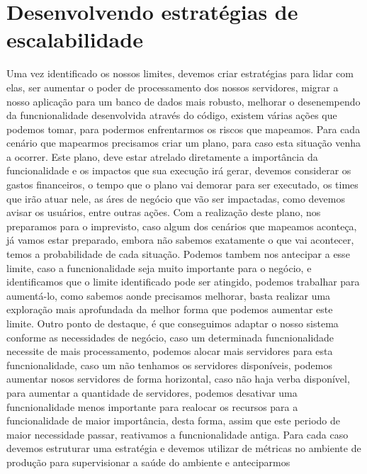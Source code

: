     \section{Desenvolvendo estratégias de escalabilidade}
      Uma vez identificado os nossos limites, devemos criar estratégias para lidar
      com elas, ser aumentar o poder de processamento dos nossos servidores,
      migrar a nosso aplicação para um banco de dados mais robusto, melhorar o
      desenempendo da funcnionalidade desenvolvida através do código, existem
      várias ações que podemos tomar, para podermos enfrentarmos os riscos que
      mapeamos. \newline
      Para cada cenário que mapearmos precisamos criar um plano, para caso esta
      situação venha a ocorrer. Este plano, deve estar atrelado diretamente a
      importância da funcionalidade e os impactos que sua execução irá gerar,
      devemos considerar os gastos financeiros, o tempo que o plano vai demorar
      para ser executado, os times que irão atuar nele, as áres de negócio que vão
      ser impactadas, como devemos avisar os usuários, entre outras ações. Com a
      realização deste plano, nos preparamos para o imprevisto, caso algum dos
      cenários que mapeamos aconteça, já vamos estar preparado, embora não sabemos
      exatamente o que vai acontecer, temos a probabilidade de cada situação. Podemos
      tambem nos antecipar a esse limite, caso a funcnionalidade seja muito importante
      para o negócio, e identificamos que o limite identificado pode ser atingido,
      podemos trabalhar para aumentá-lo, como sabemos aonde precisamos melhorar,
      basta realizar uma exploração mais aprofundada da melhor forma que podemos
      aumentar este limite. Outro ponto de destaque, é que conseguimos adaptar o
      nosso sistema conforme as necessidades de negócio, caso um determinada
      funcnionalidade necessite de mais processamento, podemos alocar mais servidores
      para esta funcnionalidade, caso um não tenhamos os servidores disponíveis,
      podemos aumentar nosos servidores de forma horizontal, caso não haja verba
      disponível, para aumentar a quantidade de servidores, podemos desativar uma
      funcnionalidade menos importante para realocar os recursos para a funcionalidade
      de maior importância, desta forma, assim que este periodo de maior necessidade
      passar, reativamos a funcnionalidade antiga. \newline
      Para cada caso devemos estruturar uma estratégia e devemos utilizar de métricas
      no ambiente de produção para supervisionar a saúde do ambiente e anteciparmos
